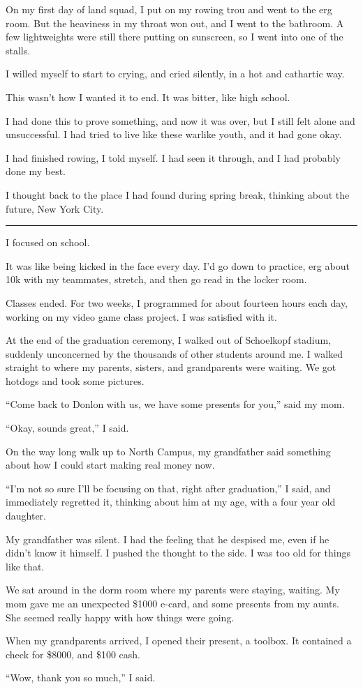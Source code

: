 On my first day of land squad, I put on my rowing trou and went to the erg room.
But the heaviness in my throat won out, and I went to the bathroom.  A few
lightweights were still there putting on sunscreen, so I went into one of the
stalls.  

I willed myself to start to crying, and cried silently, in a hot and cathartic
way.  

This wasn't how I wanted it to end.  It was bitter, like high school.  

I had done this to prove something, and now it was over, but I still felt alone
and unsuccessful.  I had tried to live like these warlike youth, and it had gone
okay.  

I had finished rowing, I told myself.  I had seen it through, and I had probably
done my best.

I thought back to the place I had found during spring break, thinking about the
future, New York City.

\plainfancybreak{12pt}{2}{}

I focused on school.

It was like being kicked in the face every day.  I'd go down to practice, erg
about 10k with my teammates, stretch, and then go read in the locker room. 

Classes ended.  For two weeks, I programmed for about fourteen hours each day,
working on my video game class project.  I was satisfied with it.

At the end of the graduation ceremony, I walked out of Schoelkopf stadium,
suddenly unconcerned by the thousands of other students around me.  I walked
straight to where my parents, sisters, and grandparents were waiting.  We got
hotdogs and took some pictures.  

``Come back to Donlon with us, we have some presents for you,'' said my mom. 

``Okay, sounds great,'' I said.

On the way long walk up to North Campus, my grandfather said something about how
I could start making real money now.

``I'm not so sure I'll be focusing on that, right after graduation,'' I said,
and immediately regretted it, thinking about him at my age, with a four year old
daughter.  

My grandfather was silent.  I had the feeling that he despised me, even if he
didn't know it himself.  I pushed the thought to the side.  I was too old for
things like that.

We sat around in the dorm room where my parents were staying, waiting.  My mom
gave me an unexpected \$1000 e-card, and some presents from my aunts.  She
seemed really happy with how things were going.

When my grandparents arrived, I opened their present, a toolbox.  It contained a
check for \$8000, and \$100 cash.

``Wow, thank you so much,'' I said.
